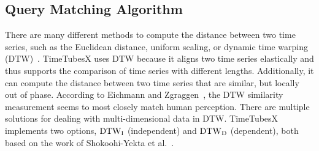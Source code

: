 \subsection{Query Matching Algorithm}\label{sec:matchingAlgorithm}
%
There are many different methods to compute the distance between two time series, such as the Euclidean distance, uniform scaling, or dynamic time warping (DTW)~\cite{Berndt1994}.
TimeTubesX uses DTW
because it aligns two time series elastically and thus supports the comparison of time series with different lengths.
Additionally, it can compute the distance between two time series that are similar, but locally out of phase.
According to Eichmann and Zgraggen~\cite{Eichmann2015}, the DTW similarity measurement seems to most closely match human perception.
There are multiple solutions for dealing with multi-dimensional data in DTW. 
TimeTubesX implements two options, ${\rm DTW}_{\rm I}$ (independent) and ${\rm DTW}_{\rm D}$ (dependent), both based on the work of Shokoohi-Yekta et al.~\cite{Shokoohi-Yekta2015}.

